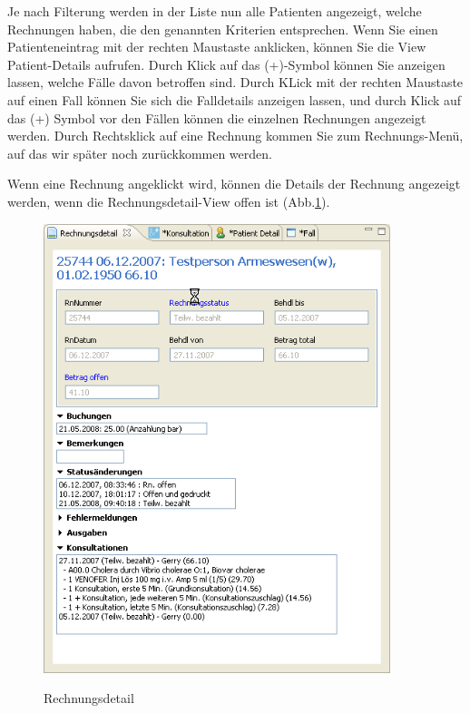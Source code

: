 \documentclass[a4paper]{scrartcl}
\begin{document}
Je nach Filterung werden in der Liste nun alle Patienten angezeigt, welche Rechnungen haben, die den genannten Kriterien entsprechen. Wenn Sie einen Patienteneintrag mit der rechten Maustaste anklicken, können Sie die View Patient-Details aufrufen. Durch Klick auf das (+)-Symbol können Sie anzeigen lassen, welche Fälle davon betroffen sind. Durch KLick mit der rechten Maustaste auf einen Fall können Sie sich die Falldetails anzeigen lassen, und durch Klick auf das (+) Symbol vor den Fällen können die einzelnen Rechnungen angezeigt werden. Durch Rechtsklick auf eine Rechnung kommen Sie zum Rechnungs-Menü, auf das wir später noch zurückkommen werden.

\medskip

Wenn eine Rechnung angeklickt wird, können die Details der Rechnung angezeigt werden, wenn die Rechnungsdetail-View offen ist (Abb.\ref{fig:abr13}).
\begin{figure}
  \includegraphics[width=0.9\textwidth]{abr13}\\
  \caption{Rechnungsdetail}\label{fig:abr13}
\end{figure}
\end{document}
